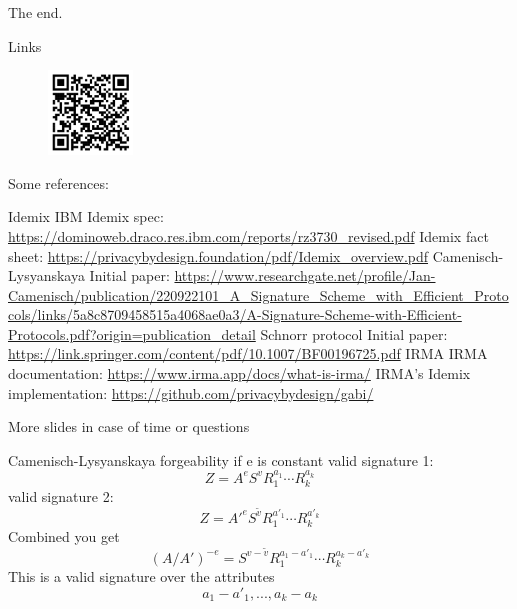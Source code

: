 \begin{frame}[standout]
  The end.
  \note{}
\end{frame}

\begin{frame}{Links}
  \begin{figure}
    \centering
    \includegraphics[width=0.2\textwidth]{Pictures/slideSource.png}
\end{figure}
Some references:
  \begin{outline}
    \1 Idemix
    \2 IBM Idemix spec: \url{https://dominoweb.draco.res.ibm.com/reports/rz3730_revised.pdf}
    \2 Idemix fact sheet: \url{https://privacybydesign.foundation/pdf/Idemix_overview.pdf}
    \1 Camenisch-Lysyanskaya
    \2 Initial paper: \url{https://www.researchgate.net/profile/Jan-Camenisch/publication/220922101_A_Signature_Scheme_with_Efficient_Protocols/links/5a8c8709458515a4068ae0a3/A-Signature-Scheme-with-Efficient-Protocols.pdf?origin=publication_detail}
    \1 Schnorr protocol
    \2 Initial paper: \url{https://link.springer.com/content/pdf/10.1007/BF00196725.pdf}
    \1 IRMA
    \2 IRMA documentation: \url{https://www.irma.app/docs/what-is-irma/}
    \2 IRMA's Idemix implementation: \url{https://github.com/privacybydesign/gabi/}
   \end{outline}
  \note{}
\end{frame}

\begin{frame}[standout]{More slides}
  in case of time or questions
  \note{}
\end{frame}

\begin{frame}{}
  \note{}
\end{frame}

\begin{frame}{Camenisch-Lysyanskaya forgeability if e is constant}
  valid signature 1:$$ Z = A^e S^v R_1^{a_1} \cdots R_{k}^{a_k} $$
  valid signature 2: $$ Z = A'^e S^{\tilde{v}} R_1^{a'_1} \cdots R_{k}^{a'_k} $$
  Combined you get $$ (A/A')^{-e} = S^{v-\tilde{v}} R_1^{a_1-a'_1} \cdots R_{k}^{a_k-a'_k} $$
  This is a valid signature over the attributes $$ a_1-a'_1, ..., a_k-a_k $$
  \note{}
\end{frame}

